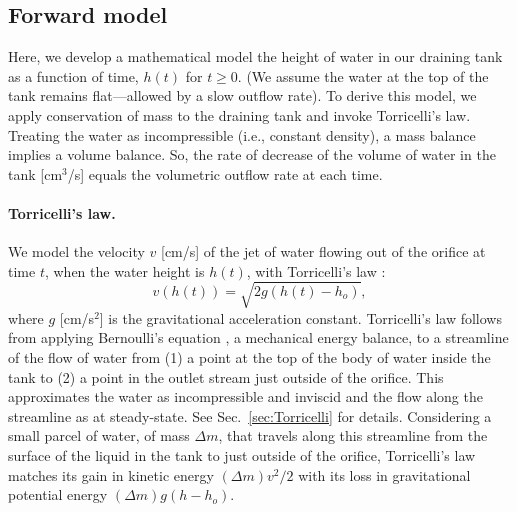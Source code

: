 \documentclass[a4paper,fleqn]{cas-dc}
\begin{document}
\subsection{Forward model} \label{sec:forward_model}
Here, we develop a mathematical model the height of water in our draining tank as a function of time, $h(t)$ for $t\geq 0$.
(We assume the water at the top of the tank remains flat---allowed by a slow outflow rate). 
To derive this model, we apply conservation of mass to the draining tank and invoke Torricelli's law.
Treating the water as incompressible (i.e., constant density), a mass balance implies a volume balance.
So, the rate of decrease of the volume of water in the tank [cm$^3$/s] equals the volumetric outflow rate at each time. 

\paragraph{Torricelli's law.}
We model the velocity $v$ [cm/s] of the jet of water flowing out of the orifice at time $t$, when the water height is $h(t)$, with Torricelli's law \cite{d2021torricelli}:
\begin{equation}
	v\left(h(t) \right) =  \sqrt{2 g(h(t)-h_o)}, \label{eq:Torricelli}
\end{equation} where $g$ [cm/s$^2$] is the gravitational acceleration constant. 
Torricelli's law follows from applying Bernoulli's equation \cite{welty2020fundamentals}, a mechanical energy balance, to a streamline of the flow of water from (1) a point at the top of the body of water inside the tank to (2) a point in the outlet stream just outside of the orifice. 
This approximates the water as incompressible and inviscid and the flow along the streamline as at steady-state. See Sec.~\ref{sec:Torricelli} for details.
Considering a small parcel of water, of mass $\Delta m$, that travels along this streamline from the surface of the liquid in the tank to just outside of the orifice,
Torricelli's law matches its gain in kinetic energy $(\Delta m) v^2/2$ with its loss in gravitational potential energy $(\Delta m)g(h-h_o)$.
\cite{groetsch1993inverse_tl,driver1998torricelli,williams2021vessel,epple2017verification}
\end{document}
